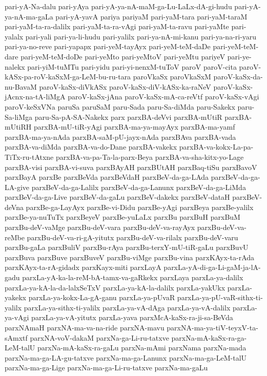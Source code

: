 {pari-yA-Na-dalu
pari-yAya
pari-yA-ya-nA-maM-ga-Lu-LaLx-dA-gi-hudu
pari-yA-ya-nA-ma-gaLa
pari-yA-yavA
pariya
pariyaM
pari-yaM-tara
pari-yaM-taraM
pari-yaM-ta-ra-dalilx
pari-yaM-ta-ra-vAgi
pari-yaM-ta-ravu
pari-yaMte
pari-yalalx
pari-yali
pari-ya-li-hudu
pari-yalilx
pari-ya-nA-mi-kanu
pari-ya-na-ri-yaru
pari-ya-no-reve
pari-yapapx
pari-yeM-tayAyx
pari-yeM-teM-daDe
pari-yeM-teM-dare
pari-yeM-teM-doDe
pari-yeMto
pari-yeMtoV
pari-yeMtu
pariyeV
pari-ye-nalekx
pari-yiM-tuMTu
pari-yidu
pari-yi-nenxM-tuToV
paroV
paroV-cita
paroV-kASx-pa-roV-kaSxM-ga-LeM-bu-ru-tara
paroVkaSx
paroVkaSxM
paroV-kaSx-da-nu-BavaM
paroV-kaSx-diVkASx
paroV-kaSx-diV-kASx-ka-raNeV
paroV-kaSx-jAcnx-na-tA-liMgA
paroV-kaSx-jAna
paroV-kaSx-mA-ca-reVtf
paroV-kaSx-vAgi
paroV-keSxVNa
paruSa
paruSaM
paru-Sada
paru-Sa-diMda
paru-Sakekx
paru-Sa-liMga
paru-Sa-pA-SA-Nakekx
parx
parxBA-deVvi
parxBA-mUtiR
parxBA-mUtiRH
parxBA-mU-tiR-yAgi
parxBA-ma-ya-mayAyx
parxBA-ma-yamf
parxBA-ma-ya-nAda
parxBA-saM-pU-jayx-nAda
parxBAva
parxBA-vada
parxBA-va-diMda
parxBA-va-do-Dane
parxBA-vakekx
parxBA-va-kokx-La-pa-TiTx-ru-tAtxne
parxBA-va-pa-Ta-la-parx-Beya
parxBA-va-sha-kitx-yo-Lage
parxBA-visi
parxBA-vi-suva
parxBAyAH
parxBUtAH
parxBaq-tiSu
parxBavoV
parxBayA
parxBe
parxBeVda
parxBeVdaH
parxBeV-da-ga-LAda
parxBeV-da-ga-LA-give
parxBeV-da-ga-Lalilx
parxBeV-da-ga-Lanunx
parxBeV-da-ga-LiMda
parxBeV-da-ga-Live
parxBeV-da-gaLu
parxBeV-dakekx
parxBeV-dataH
parxBeV-deVna
parxBe-ga-LayAyx
parxBe-vi-Didu
parxBe-yAgi
parxBeya
parxBe-yalilx
parxBe-ya-nuTuTx
parxBeyeV
parxBe-yuLaLx
parxBu
parxBuH
parxBuM
parxBu-deV-vaMge
parxBu-deV-vara
parxBu-deV-va-rayAyx
parxBu-deV-va-reMbe
parxBu-deV-va-ri-gA-yitutx
parxBu-deV-va-rilalx
parxBu-deV-varu
parxBu-gaLa
parxBuliV
parxBu-rAya
parxBu-terxY-mU-tiR-gaLu
parxBuvU
parxBuva
parxBuve
parxBuveV
parxBu-viMge
parxBu-vina
parxKAyx-ta-rAda
parxKAyx-ta-rA-gidadx
parxKayx-miti
parxLayA
parxLa-yA-di-ga-Li-gaM-ja-lA-gadu
parxLa-yA-ka-la-reM-bA-tamx-va-gaRkekx
parxLaya
parxLa-ya-dalilx
parxLa-ya-kA-la-da-lalxSeTxV
parxLa-ya-kA-la-dalilx
parxLa-yakUkx
parxLa-yakekx
parxLa-ya-kokx-La-gA-ganu
parxLa-ya-pUvaR
parxLa-ya-pU-vaR-sithx-ti-yalilx
parxLa-ya-sithx-ti-yalilx
parxLa-ya-vA-dAga
parxLa-ya-vA-dalilx
parxLa-ya-vAgi
parxLa-ya-vA-yitutx
parxLa-yava
parxMcA-kaSx-ra-ji-sa-BeVda
parxNAmaH
parxNA-ma-va-na-ride
parxNA-mavu
parxNA-ma-ya-tiV-teyxV-ta-sAmxtf
parxNA-voV-dakaM
parxNa-ga-Li-ru-tatxve
parxNa-mA-kaSx-ra-ga-LeM-talU
parxNa-mA-kaSx-ra-gaLu
parxNa-mAmi
parxNama
parxNa-mada
parxNa-ma-ga-LA-gu-tatxve
parxNa-ma-ga-Lanunx
parxNa-ma-ga-LeM-talU
parxNa-ma-ga-Lige
parxNa-ma-ga-Li-ru-tatxve
parxNa-ma-gaLu
}
